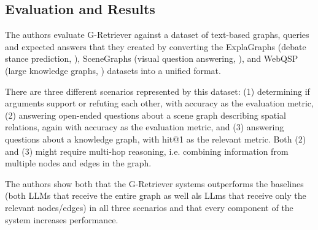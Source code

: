\subsection{Evaluation and Results}

The authors evaluate G-Retriever against a dataset of text-based graphs, queries and expected answers that they created by converting the ExplaGraphs (debate stance prediction, \cite{explagraphs}), SceneGraphs (visual question answering, \cite{scenegraphs}), and WebQSP (large knowledge graphs, \cite{webqsp}) datasets into a unified format.

There are three different scenarios represented by this dataset: (1) determining if arguments support or refuting each other, with accuracy as the evaluation metric, (2) answering open-ended questions about a scene graph describing spatial relations, again with accuracy as the evaluation metric, and (3) answering questions about a knowledge graph, with hit@1 as the relevant metric. Both (2) and (3) might require multi-hop reasoning, i.e. combining information from multiple nodes and edges in the graph.

The authors show both that the G-Retriever systems outperforms the baselines (both LLMs that receive the entire graph as well als LLms that receive only the relevant nodes/edges) in all three scenarios and that every component of the system increases performance.
